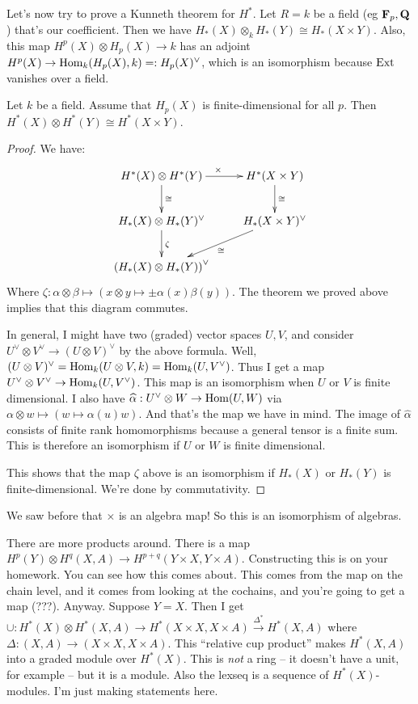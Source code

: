 Let's now try to prove a Kunneth theorem for $ H^\ast$. Let $R=k$ be a field (eg $\mathbf F_p,\mathbf Q$) that's our coefficient. Then we have $ H_\ast(X)\otimes_k H_\ast(Y)\cong H_\ast(X\times Y)$. Also, this map $ H^p(X)\otimes H_p(X)\to k$ has an adjoint $ H^p(X)\to \operatorname{Hom}_k( H_p(X),k)=: H_p(X)^\vee$, which is an isomorphism because $\operatorname{Ext}$ vanishes over a field.
\begin{theorem}
Let $k$ be a field. Assume that $ H_p(X)$ is finite-dimensional for all $p$. Then $ H^\ast(X)\otimes H^\ast(Y)\cong H^\ast(X\times Y)$.
\end{theorem}
\begin{proof}
We have:
\begin{equation*}
\xymatrix{
	 H^\ast(X)\otimes H^\ast(Y)\ar[r]^{\times}\ar[d]^\cong & H^\ast(X\times Y)\ar[d]^\cong\\
	 H_\ast(X)\otimes H_\ast(Y)^\vee\ar[d]^{\zeta} & H_\ast(X\times Y)^\vee\ar[dl]^\cong\\
	\left( H_\ast(X)\otimes H_\ast(Y)\right)^\vee
}
\end{equation*}
Where $\zeta:\alpha\otimes\beta\mapsto(x\otimes y\mapsto \pm\alpha(x)\beta(y))$. The theorem we proved above implies that this diagram commutes.

In general, I might have two (graded) vector spaces $U,V$, and consider $U^\vee\otimes V^\vee\to(U\otimes V)^\vee$ by the above formula. Well, $(U\otimes V)^\vee=\operatorname{Hom}_k(U\otimes V,k)=\operatorname{Hom}_k(U,V^\vee)$. Thus I get a map $U^\vee\otimes V^\vee\to\operatorname{Hom}_k(U,V^\vee)$. This map is an isomorphism when $U$ or $V$ is finite dimensional. I also have $\widehat{\alpha}:U^\vee\otimes W\to \operatorname{Hom}(U,W)$ via $\alpha\otimes w\mapsto(w\mapsto\alpha(u)w)$. And that's the map we have in mind. The image of $\widehat{\alpha}$ consists of finite rank homomorphisms because a general tensor is a finite sum. This is therefore an isomorphism if $U$ or $W$ is finite dimensional. 

This shows that the map $\zeta$ above is an isomorphism if $ H_\ast(X)$ or $ H_\ast(Y)$ is finite-dimensional. We're done by commutativity.
\end{proof}
We saw before that $\times$ is an algebra map! So this is an isomorphism of algebras.

There are more products around. There is a map $ H^p(Y)\otimes H^q(X,A)\to H^{p+q}(Y\times X,Y\times A)$. Constructing this is on your homework. You can see how this comes about. This comes from the map on the chain level, and it comes from looking at the cochains, and you're going to get a map (???). Anyway. Suppose $Y=X$. Then I get $\cup: H^\ast(X)\otimes H^\ast(X,A)\to H^\ast(X\times X,X\times A)\xrightarrow{\Delta^\ast} H^\ast(X,A)$ where $\Delta:(X,A)\to (X\times X,X\times A)$. This ``relative cup product'' makes $ H^\ast(X,A)$ into a graded module over $ H^\ast(X)$. This is \emph{not} a ring -- it doesn't have a unit, for example -- but it is a module. Also the lexseq is a sequence of $ H^\ast(X)$-modules. I'm just making statements here.

